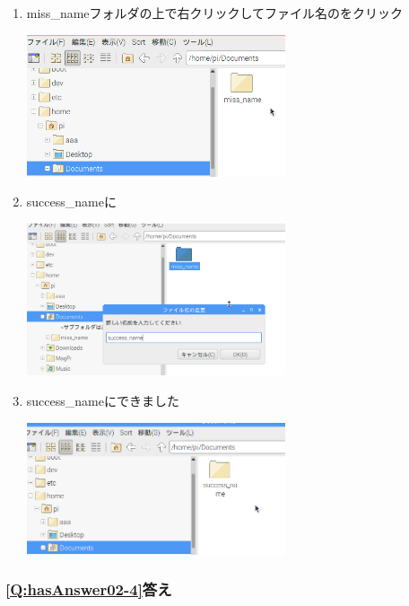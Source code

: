 \documentclass[a4paper,12pt]{jarticle}
\begin{document}
\begin{enumerate}
  \item
        miss\_nameフォルダの上で右クリックしてファイル名のをクリック

        \centering
        \includegraphics[width=0.6\textwidth]{textbook-img214.png}
        \flushleft

  \item success\_nameに

        \centering
        \includegraphics[width=0.6\textwidth]{textbook-img215.png}
        \flushleft
  \item success\_nameにできました

        \centering
        \includegraphics[width=0.6\textwidth]{textbook-img216.png}
        \flushleft
\end{enumerate}



\subsubsection{\bfseries
\ref*{Q:hasAnswer02-4}答え}
\end{document}
